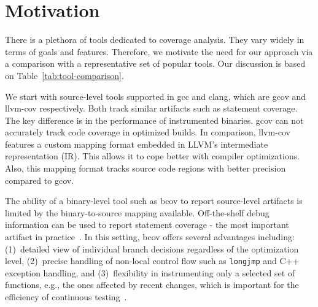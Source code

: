 \section{Motivation}
\label{sec:motivation}

There is a plethora of tools dedicated to coverage analysis.
They vary widely in terms of goals and features.
Therefore, we motivate the need for our approach via a comparison with a representative set of popular tools. 
Our discussion is based on Table~\ref{tab:tool-comparison}.

We start with source-level tools supported in \textsf{gcc} and \textsf{clang}, which are \textsf{gcov} and  \textsf{llvm-cov} respectively.
Both track similar artifacts such as statement coverage.
The key difference is in the performance of instrumented binaries.
\textsf{gcov} can not accurately track code coverage in optimized builds.
In comparison, \textsf{llvm-cov} features a custom mapping format embedded in LLVM's intermediate representation (IR).
This allows it to cope better with compiler optimizations.
Also, this mapping format tracks source code regions with better precision compared to \textsf{gcov}.

The ability of a binary-level tool such as \textsf{bcov} to report source-level artifacts is limited by the binary-to-source mapping available.
Off-the-shelf debug information can be used to report statement coverage - the most important artifact in practice~\cite{IvankovicFSE19, Gopinath2014}.
In this setting, \textsf{bcov} offers several advantages including:
(1)~detailed view of individual branch decisions regardless of the optimization level,
(2)~precise handling of non-local control flow such as \texttt{longjmp} and C++ exception handling, and
(3)~flexibility in instrumenting only a selected set of functions, e.g., the ones affected by recent changes, which is important for the efficiency of continuous testing~\cite{IvankovicFSE19}.


